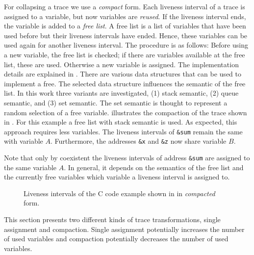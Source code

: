 \documentclass[onecolumn, openright, master, english, signatures]{dbrgrptt}
\begin{document}
For collapsing a \ac{trace} we use a \emph{compact} form.
Each liveness interval of a \ac{trace} is assigned to a variable, but now variables are \emph{reused}.
If the liveness interval ends, the variable is added to a \emph{free list}.
A free list is a list of variables that have been used before but their liveness intervals have ended.
Hence, these variables can be used again for another liveness interval.
The procedure is as follows: Before using a new variable, the free list is checked; if there are variables available at the free list, these are used.
Otherwise a new variable is assigned.
The implementation details are explained in .
There are various data structures that can be used to implement a free.
The selected data structure influences the semantic of the free list.
In this work three variants are investigated, (1) stack semantic, (2) queue semantic, and (3) set semantic.
The set semantic is thought to represent a random selection of a free variable.
 illustrates the compaction of the \ac{trace} shown in .
For this example a free list with stack semantic is used.
As expected, this approach requires less variables.
The liveness intervals of \texttt{\&sum} remain the same with variable $A$.
Furthermore, the addresses \texttt{\&x} and \texttt{\&z} now share variable $B$.

\begin{remark}
Note that only by coexistent the liveness intervals of address \texttt{\&sum} are assigned to the same variable $A$.
In general, it depends on the semantics of the free list and the currently free variables which variable a liveness interval is assigned to.
\end{remark}

\begin{figure}[!ht]
  \centering
  
  \caption{Liveness intervals of the C code example shown in  in \emph{compacted} form.}
  \label{fig:trace-transformation-compact}
\end{figure}

This section presents two different kinds of \ac{trace} transformations, single assignment and compaction.
Single assignment potentially increases the number of used variables and compaction potentially decreases the number of used variables.

\end{document}
